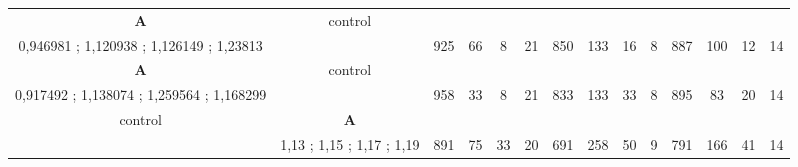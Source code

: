 \begin{table}[]
{\begin{tabular}{|c|c|c|c|c|c|c|c|c|c|c|c|c|c|}
\cellcolor{blue!15}\textbf{A} & control& {\color[HTML]{00009B} } & {\color[HTML]{9A0000} } & {\color[HTML]{009901} } &  & {\color[HTML]{00009B} } & {\color[HTML]{9A0000} } & {\color[HTML]{009901} } &  & {\color[HTML]{00009B} } & {\color[HTML]{9A0000} } & {\color[HTML]{009901} } &  \\ 
\cellcolor{ blue!15}0,946981 ; 1,120938 ; 1,126149 ; 1,23813 &  & \multirow{-2}{*}{{\color[HTML]{00009B} 925}} & \multirow{-2}{*}{{\color[HTML]{9A0000} 66}} & \multirow{-2}{*}{{\color[HTML]{009901} 8}} & \multirow{-2}{*}{21} & \multirow{-2}{*}{{\color[HTML]{00009B} 850}} & \multirow{-2}{*}{{\color[HTML]{9A0000} 133}} & \multirow{-2}{*}{{\color[HTML]{009901} 16}} & \multirow{-2}{*}{8} & \multirow{-2}{*}{{\color[HTML]{00009B} 887}} & \multirow{-2}{*}{{\color[HTML]{9A0000} 100}} & \multirow{-2}{*}{{\color[HTML]{009901} 12}} & \multirow{-2}{*}{14} \\ \hline

\cellcolor{blue!15}\textbf{A} & control& {\color[HTML]{00009B} } & {\color[HTML]{9A0000} } & {\color[HTML]{009901} } &  & {\color[HTML]{00009B} } & {\color[HTML]{9A0000} } & {\color[HTML]{009901} } &  & {\color[HTML]{00009B} } & {\color[HTML]{9A0000} } & {\color[HTML]{009901} } &  \\ 
\cellcolor{ blue!15}0,917492 ; 1,138074 ; 1,259564 ; 1,168299 &  & \multirow{-2}{*}{{\color[HTML]{00009B} 958}} & \multirow{-2}{*}{{\color[HTML]{9A0000} 33}} & \multirow{-2}{*}{{\color[HTML]{009901} 8}} & \multirow{-2}{*}{21} & \multirow{-2}{*}{{\color[HTML]{00009B} 833}} & \multirow{-2}{*}{{\color[HTML]{9A0000} 133}} & \multirow{-2}{*}{{\color[HTML]{009901} 33}} & \multirow{-2}{*}{8} & \multirow{-2}{*}{{\color[HTML]{00009B} 895}} & \multirow{-2}{*}{{\color[HTML]{9A0000} 83}} & \multirow{-2}{*}{{\color[HTML]{009901} 20}} & \multirow{-2}{*}{14} \\ \hline

control & \cellcolor{blue!15}\textbf{A}& {\color[HTML]{00009B} } & {\color[HTML]{9A0000} } & {\color[HTML]{009901} } &  & {\color[HTML]{00009B} } & {\color[HTML]{9A0000} } & {\color[HTML]{009901} } &  & {\color[HTML]{00009B} } & {\color[HTML]{9A0000} } & {\color[HTML]{009901} } &  \\ 
 & \cellcolor{ blue!15}1,13 ; 1,15 ; 1,17 ; 1,19 & \multirow{-2}{*}{{\color[HTML]{00009B} 891}} & \multirow{-2}{*}{{\color[HTML]{9A0000} 75}} & \multirow{-2}{*}{{\color[HTML]{009901} 33}} & \multirow{-2}{*}{20} & \multirow{-2}{*}{{\color[HTML]{00009B} 691}} & \multirow{-2}{*}{{\color[HTML]{9A0000} 258}} & \multirow{-2}{*}{{\color[HTML]{009901} 50}} & \multirow{-2}{*}{9} & \multirow{-2}{*}{{\color[HTML]{00009B} 791}} & \multirow{-2}{*}{{\color[HTML]{9A0000} 166}} & \multirow{-2}{*}{{\color[HTML]{009901} 41}} & \multirow{-2}{*}{14} \\ \hline


\end{tabular}}
\end{table}
